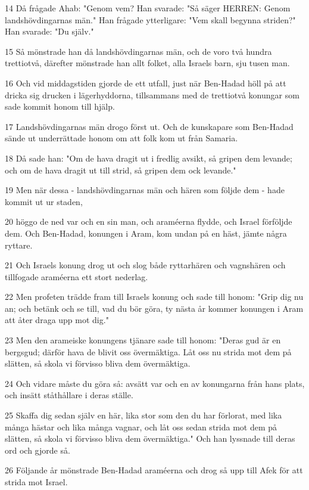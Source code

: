 \par 14 Då frågade Ahab: "Genom vem? Han svarade: "Så säger HERREN: Genom landshövdingarnas män." Han frågade ytterligare: "Vem skall begynna striden?" Han svarade: "Du själv."
\par 15 Så mönstrade han då landshövdingarnas män, och de voro två hundra trettiotvå, därefter mönstrade han allt folket, alla Israels barn, sju tusen man.
\par 16 Och vid middagstiden gjorde de ett utfall, just när Ben-Hadad höll på att dricka sig drucken i lägerhyddorna, tillsammans med de trettiotvå konungar som sade kommit honom till hjälp.
\par 17 Landshövdingarnas män drogo först ut. Och de kunskapare som Ben-Hadad sände ut underrättade honom om att folk kom ut från Samaria.
\par 18 Då sade han: "Om de hava dragit ut i fredlig avsikt, så gripen dem levande; och om de hava dragit ut till strid, så gripen dem ock levande."
\par 19 Men när dessa - landshövdingarnas män och hären som följde dem - hade kommit ut ur staden,
\par 20 höggo de ned var och en sin man, och araméerna flydde, och Israel förföljde dem. Och Ben-Hadad, konungen i Aram, kom undan på en häst, jämte några ryttare.
\par 21 Och Israels konung drog ut och slog både ryttarhären och vagnshären och tillfogade araméerna ett stort nederlag.
\par 22 Men profeten trädde fram till Israels konung och sade till honom: "Grip dig nu an; och betänk och se till, vad du bör göra, ty nästa år kommer konungen i Aram att åter draga upp mot dig."
\par 23 Men den arameiske konungens tjänare sade till honom: "Deras gud är en bergsgud; därför hava de blivit oss övermäktiga. Låt oss nu strida mot dem på slätten, så skola vi förvisso bliva dem övermäktiga.
\par 24 Och vidare måste du göra så: avsätt var och en av konungarna från hans plats, och insätt ståthållare i deras ställe.
\par 25 Skaffa dig sedan själv en här, lika stor som den du har förlorat, med lika många hästar och lika många vagnar, och låt oss sedan strida mot dem på slätten, så skola vi förvisso bliva dem övermäktiga." Och han lyssnade till deras ord och gjorde så.
\par 26 Följande år mönstrade Ben-Hadad araméerna och drog så upp till Afek för att strida mot Israel.
